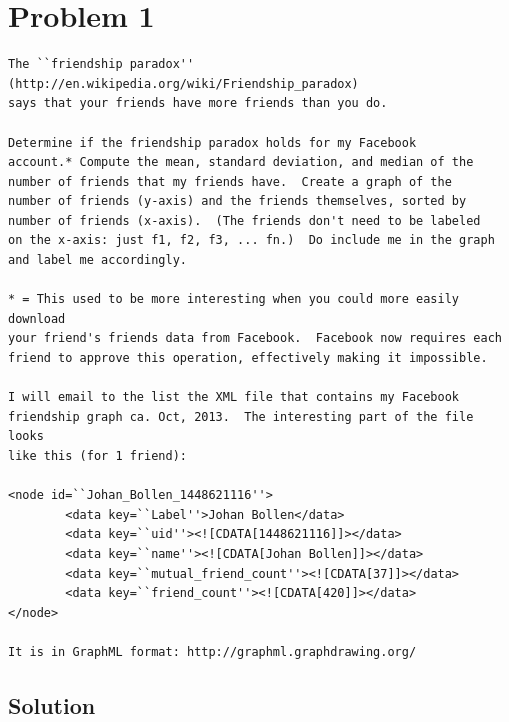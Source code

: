  
\section{Problem 1}
\label{part1}
\begin{verbatim}
The ``friendship paradox'' (http://en.wikipedia.org/wiki/Friendship_paradox)
says that your friends have more friends than you do.  

Determine if the friendship paradox holds for my Facebook
account.* Compute the mean, standard deviation, and median of the
number of friends that my friends have.  Create a graph of the
number of friends (y-axis) and the friends themselves, sorted by
number of friends (x-axis).  (The friends don't need to be labeled
on the x-axis: just f1, f2, f3, ... fn.)  Do include me in the graph
and label me accordingly.

* = This used to be more interesting when you could more easily download
your friend's friends data from Facebook.  Facebook now requires each
friend to approve this operation, effectively making it impossible.

I will email to the list the XML file that contains my Facebook
friendship graph ca. Oct, 2013.  The interesting part of the file looks
like this (for 1 friend):

<node id=``Johan_Bollen_1448621116''>
        <data key=``Label''>Johan Bollen</data>
        <data key=``uid''><![CDATA[1448621116]]></data>
        <data key=``name''><![CDATA[Johan Bollen]]></data>
        <data key=``mutual_friend_count''><![CDATA[37]]></data>
        <data key=``friend_count''><![CDATA[420]]></data>
</node>

It is in GraphML format: http://graphml.graphdrawing.org/
\end{verbatim}

\subsection{Solution}

